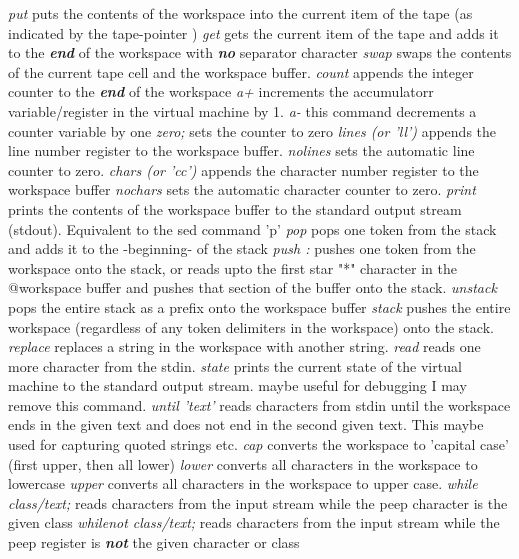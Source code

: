 \documentclass[a4paper,12pt]{article}
\begin{document}
 \emph{ put }
      puts the contents of the workspace into the current
      item of the tape (as indicated by the tape-pointer )
 \emph{ get }
      gets the current item of the tape and adds it to
      the \textbf{\emph{end}} of the workspace with \textbf{\emph{no}} separator character
 \emph{ swap }
      swaps the contents of the current tape cell and the
      workspace buffer.
 \emph{ count  }
      appends the integer counter to the \textbf{\emph{end}} of the workspace
 \emph{ a+  }
      increments the accumulatorr variable/register in the virtual
      machine by 1.
 \emph{ a-  }
      this command decrements a counter variable by one
 \emph{ zero; }
      sets the counter to zero
 \emph{ lines (or 'll') }
      appends the line number register to the workspace buffer.
 \emph{ nolines  }
      sets the automatic line counter to zero.
 \emph{ chars (or 'cc') }
      appends the character number register to the workspace buffer
 \emph{ nochars }
      sets the automatic character counter to zero.
 \emph{ print }
      prints the contents of the workspace buffer to the standard
      output stream (stdout). Equivalent to the sed command 'p'
 \emph{ pop }
      pops one token from the stack and adds it to the
      -beginning- of the stack
 \emph{ push : }
      pushes one token from the workspace onto the stack, or
      reads upto the first star "*" character in the @workspace buffer
      and pushes that section of the buffer onto the stack.
 \emph{ unstack }
      pops the entire stack as a prefix onto the workspace buffer
 \emph{ stack }
      pushes the entire workspace (regardless of any token delimiters
      in the workspace) onto the stack.
 \emph{ replace }
      replaces a string in the workspace with another string.
 \emph{ read }
      reads one more character from the stdin.
 \emph{ state }
      prints the current state of the virtual machine
      to the standard output stream. maybe useful for debugging
      I may remove this command.
 \emph{ until 'text' }
      reads characters from stdin until the workspace
      ends in the given text and does not end in the
      second given text. This maybe used for capturing
      quoted strings etc.
 \emph{ cap }
      converts the workspace to 'capital case' (first upper, then all lower)
 \emph{ lower }
      converts all characters in the workspace to lowercase
 \emph{ upper }
      converts all characters in the workspace to upper case.
 \emph{ while class/text; }
      reads characters from the input stream while the
      peep character is the given class
 \emph{ whilenot class/text; }
      reads characters from the input stream while the
      peep register is \textbf{\emph{not}} the given character or class
\end{document}
